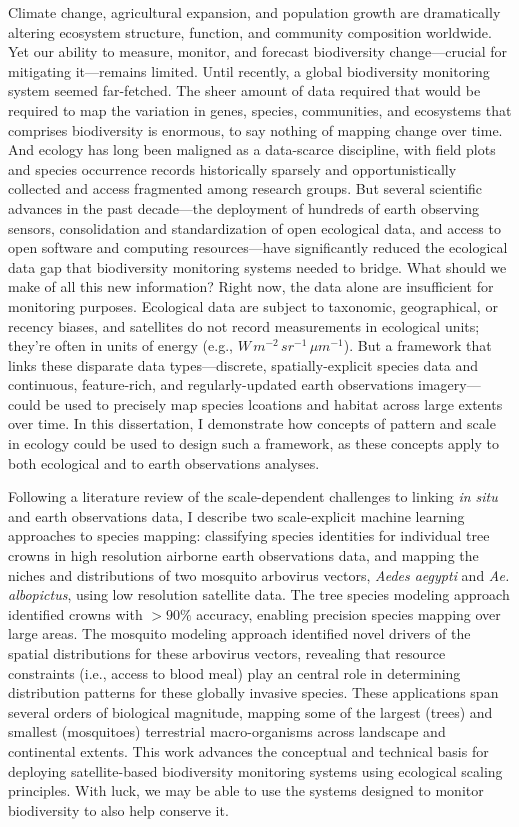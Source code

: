 
Climate change, agricultural expansion, and population growth are dramatically altering ecosystem structure, function, and community composition worldwide. Yet our ability to measure, monitor, and forecast biodiversity change—crucial for mitigating it—remains limited. Until recently, a global biodiversity monitoring system seemed far-fetched. The sheer amount of data required that would be required to map the variation in genes, species, communities, and ecosystems that comprises biodiversity is enormous, to say nothing of mapping change over time. And ecology has long been maligned as a data-scarce discipline, with field plots and species occurrence records historically sparsely and opportunistically collected and access fragmented among research groups. But several scientific advances in the past decade—the deployment of hundreds of earth observing sensors, consolidation and standardization of open ecological data, and access to open software and computing resources—have significantly reduced the ecological data gap that biodiversity monitoring systems needed to bridge. What should we make of all this new information? Right now, the data alone are insufficient for monitoring purposes. Ecological data are subject to taxonomic, geographical, or recency biases, and satellites do not record measurements in ecological units; they're often in units of energy (e.g., $W\, m^{-2}\, sr^{-1}\, {\mu}m^{-1}$). But a framework that links these disparate data types—discrete, spatially-explicit species data and continuous, feature-rich, and regularly-updated earth observations imagery—could be used to precisely map species lcoations and habitat across large extents over time. In this dissertation, I demonstrate how concepts of pattern and scale in ecology could be used to design such a framework, as these concepts apply to both ecological and to earth observations analyses.

Following a literature review of the scale-dependent challenges to linking \textit{in situ} and earth observations data, I describe two scale-explicit machine learning approaches to species mapping: classifying species identities for individual tree crowns in high resolution airborne earth observations data, and mapping the niches and distributions of two mosquito arbovirus vectors, \textit{Aedes aegypti} and \textit{Ae. albopictus}, using low resolution satellite data. The tree species modeling approach identified crowns with $>90\%$ accuracy, enabling precision species mapping over large areas. The mosquito modeling approach identified novel drivers of the spatial distributions for these arbovirus vectors, revealing that resource constraints (i.e., access to blood meal) play an central role in determining distribution patterns for these globally invasive species. These applications span several orders of biological magnitude, mapping some of the largest (trees) and smallest (mosquitoes) terrestrial macro-organisms across landscape and continental extents. This work advances the conceptual and technical basis for deploying satellite-based biodiversity monitoring systems using ecological scaling principles. With luck, we may be able to use the systems designed to monitor biodiversity to also help conserve it.